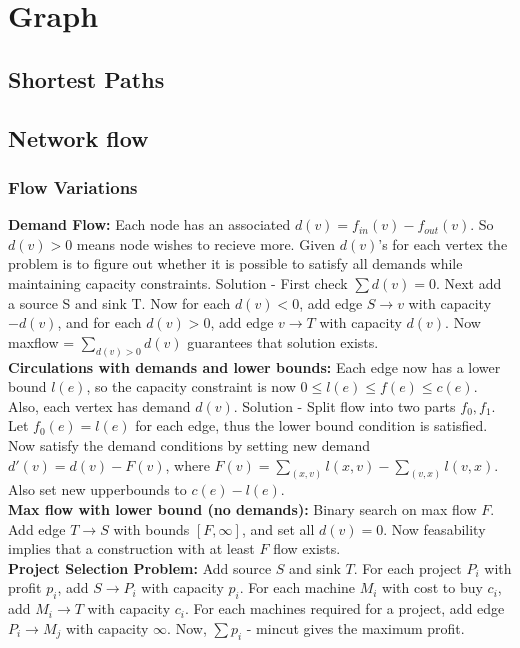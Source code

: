 \chapter{Graph}

\section{Shortest Paths}

\section{Network flow}
  \subsection{Flow Variations}
\textbf{Demand Flow:} Each node has an associated $d(v) = f_{in}(v) - f_{out}(v)$. So $d(v) > 0$ means node wishes to recieve more. Given $d(v)$'s for each vertex the problem is to figure out whether it is possible to satisfy all demands while maintaining capacity constraints. Solution - First check $\sum d(v) = 0$. Next add a source S and sink T. Now for each $d(v) < 0$, add edge $S \rightarrow v$ with capacity $-d(v)$, and for each $d(v) > 0$, add edge $v \rightarrow T$ with capacity $d(v)$. Now maxflow = $\sum_{d(v) > 0} d(v)$ guarantees that solution exists.\\
\textbf{Circulations with demands and lower bounds:} Each edge now has a lower bound $l(e)$, so the capacity constraint is now $0 \leq l(e) \leq f(e) \leq c(e)$. Also, each vertex has demand $d(v)$. Solution - Split flow into two parts $f_0, f_1$. Let $f_0(e) = l(e)$ for each edge, thus the lower bound condition is satisfied. Now satisfy the demand conditions by setting new demand $d'(v) = d(v) - F(v)$, where $F(v) = \sum_{(x, v)} l(x, v) - \sum_{(v, x)} l(v, x)$. Also set new upperbounds to $c(e) - l(e)$.\\
\textbf{Max flow with lower bound (no demands):} Binary search on max flow $F$. Add edge $T \rightarrow S$ with bounds $[F, \infty]$, and set all $d(v) = 0$. Now feasability implies that a construction with at least $F$ flow exists.\\
\textbf{Project Selection Problem:} Add source $S$ and sink $T$. For each project $P_i$ with profit $p_i$, add $S \rightarrow P_i$ with capacity $p_i$. For each machine $M_i$ with cost to buy $c_i$, add $M_i \rightarrow T$ with capacity $c_i$. For each machines required for a project, add edge $P_i \rightarrow M_j$ with capacity $\infty$. Now, $\sum p_i$ - mincut gives the maximum profit.\\

